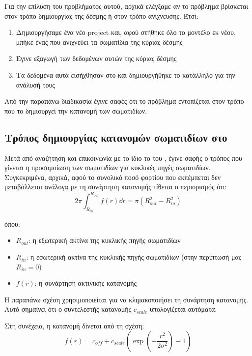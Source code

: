 Για την επίλυση του προβλήματος αυτού, αρχικά ελέγξαμε αν το πρόβλημα βρίσκεται στον τρόπο δημιουργίας της δέσμης ή στον τρόπο ανίχνευσης. 
Έτσι:
\begin{enumerate}
\item Δημιουργήσαμε ένα νέο project και, αφού στήθηκε όλο το μοντέλο εκ νέου, μπήκε ένας  που ανιχνεύει τα σωματίδια της κύριας δέσμης
\item Έγινε εξαγωγή των δεδομένων αυτών της κύριας δέσμης
\item Τα δεδομένα αυτά εισήχθησαν στο  και δημιουργήθηκε το κατάλληλο  για την ανάλυσή τους
\end{enumerate}

Από την παραπάνω διαδικασία έγινε σαφές ότι το πρόβλημα εντοπίζεται στον τρόπο που το  δημιουργεί την κατανομή των σωματιδίων.

\subsection{Τρόπος δημιουργίας  κατανομών σωματιδίων στο }

Μετά από αναζήτηση και επικοινωνία με το ίδιο το  του , έγινε σαφής ο τρόπος που γίνεται η προσομοίωση των σωματιδίων για  κυκλικές πηγές σωματιδίων.
Συγκεκριμένα, αρχικά, αφού το συνολικό ποσό φορτίου που εκπέμπεται δεν μεταβάλλεται ανάλογα με τη συνάρτηση κατανομής τίθεται ο περιορισμός ότι:
\begin{equation}\label{eq:CST_gaussian_restriction}
2\pi \int_{R_{in}}^{R_{out}} f(r) \dd r = \pi \left(R_{out}^2 - R_{in}^2 \right) 
\end{equation}

όπου:
\begin{itemize}
\item $R_{out}$: η εξωτερική ακτίνα της κυκλικής πηγής σωματιδίων
\item $R_{in}$: η εσωτερική ακτίνα της κυκλικής πηγής σωματιδίων (στην περίπτωσή μας $R_{in} = 0$)
\item $f(r)$: η συνάρτηση ακτινικής κατανομής 
\end{itemize} 

Η παραπάνω σχέση χρησιμοποιείται για να κλιμακοποιήσει τη συνάρτηση κατανομής. 
Αυτό σημαίνει ότι ο συντελεστής κατανομής $c_{scale}$ υπολογίζεται αυτόματα.

Στη συνέχεια, η  κατανομή δίνεται από τη σχέση:
\begin{equation}
f(r) = c_{off} + c_{scale} \left( \exp \left(-\frac{r^2}{2\sigma^2}\right) - 1 \right)
\end{equation}

